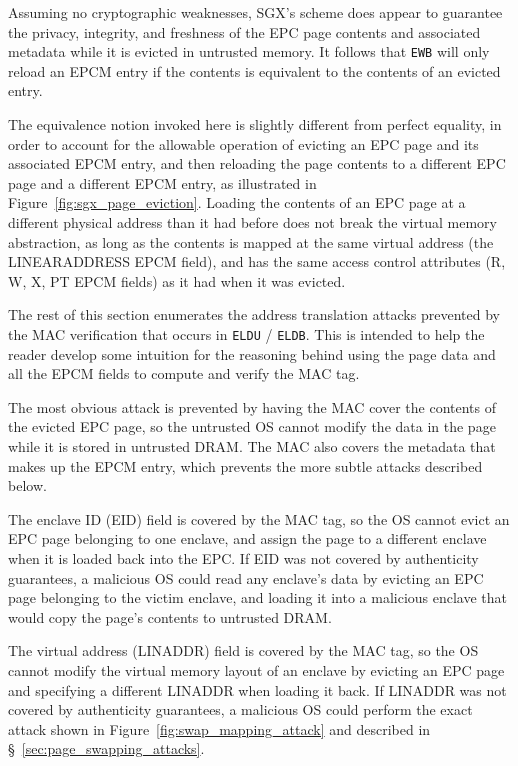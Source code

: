 Assuming no cryptographic weaknesses, SGX's scheme does appear to guarantee the
privacy, integrity, and freshness of the EPC page contents and associated
metadata while it is evicted in untrusted memory. It follows that \texttt{EWB}
will only reload an EPCM entry if the contents is equivalent to the contents of
an evicted entry.

The equivalence notion invoked here is slightly different from perfect
equality, in order to account for the allowable operation of evicting an EPC
page and its associated EPCM entry, and then reloading the page contents to a
different EPC page and a different EPCM entry, as illustrated in
Figure~\ref{fig:sgx_page_eviction}. Loading the contents of an EPC page at a
different physical address than it had before does not break the virtual memory
abstraction, as long as the contents is mapped at the same virtual address
(the LINEARADDRESS EPCM field), and has the same access control attributes
(R, W, X, PT EPCM fields) as it had when it was evicted.

The rest of this section enumerates the address translation attacks prevented
by the MAC verification that occurs in \texttt{ELDU} / \texttt{ELDB}. This is
intended to help the reader develop some intuition for the reasoning behind
using the page data and all the EPCM fields to compute and verify the MAC tag.

The most obvious attack is prevented by having the MAC cover the contents of
the evicted EPC page, so the untrusted OS cannot modify the data in the page
while it is stored in untrusted DRAM. The MAC also covers the metadata that
makes up the EPCM entry, which prevents the more subtle attacks described
below.

The enclave ID (EID) field is covered by the MAC tag, so the OS cannot evict an
EPC page belonging to one enclave, and assign the page to a different enclave
when it is loaded back into the EPC. If EID was not covered by authenticity
guarantees, a malicious OS could read any enclave's data by evicting an EPC
page belonging to the victim enclave, and loading it into a malicious enclave
that would copy the page's contents to untrusted DRAM.

The virtual address (LINADDR) field is covered by the MAC tag, so the OS cannot
modify the virtual memory layout of an enclave by evicting an EPC page and
specifying a different LINADDR when loading it back. If LINADDR was not covered
by authenticity guarantees, a malicious OS could perform the exact attack shown
in Figure~\ref{fig:swap_mapping_attack} and described in
\S~\ref{sec:page_swapping_attacks}.

